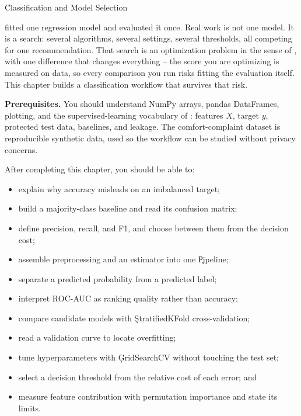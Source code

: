 
\h{Classification and Model Selection}
\label{ch:20}

 fitted one regression model and evaluated it once.
Real work is not one model. It is a search: several algorithms, several settings,
several thresholds, all competing for one recommendation. That search is an
optimization problem in the sense of , with one
difference that changes everything -- the score you are optimizing is measured on
data, so every comparison you run risks fitting the evaluation itself. This
chapter builds a classification workflow that survives that risk.

\begin{NoteBox}
\textbf{Prerequisites.} You should understand NumPy arrays, pandas DataFrames,
plotting, and the supervised-learning vocabulary of :
features $X$, target $y$, protected test data, baselines, and leakage. The
comfort-complaint dataset is reproducible synthetic data, used so the workflow
can be studied without privacy concerns.
\end{NoteBox}

\begin{tcolorbox}[title=Learning outcomes,colframe=orange,colback=white,arc=2mm]
After completing this chapter, you should be able to:
\begin{itemize}
    \item explain why accuracy misleads on an imbalanced target;
    \item build a majority-class baseline and read its confusion matrix;
    \item define precision, recall, and F1, and choose between them from the decision cost;
    \item assemble preprocessing and an estimator into one \c{Pipeline};
    \item separate a predicted probability from a predicted label;
    \item interpret ROC-AUC as ranking quality rather than accuracy;
    \item compare candidate models with \c{StratifiedKFold} cross-validation;
    \item read a validation curve to locate overfitting;
    \item tune hyperparameters with \c{GridSearchCV} without touching the test set;
    \item select a decision threshold from the relative cost of each error; and
    \item measure feature contribution with permutation importance and state its limits.
\end{itemize}
\end{tcolorbox}

